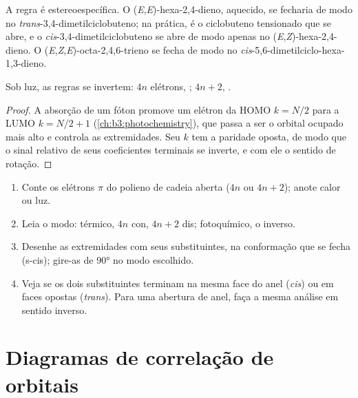 A regra é estereoespecífica. O (\textit{E},\textit{E})-hexa-2,4-dieno, aquecido, se fecharia
de modo  no \textit{trans}-3,4-dimetilciclobuteno; na prática, é o
ciclobuteno tensionado que se abre, e o \textit{cis}-3,4-dimetilciclobuteno se abre
de modo  apenas no (\textit{E},\textit{Z})-hexa-2,4-dieno. O (\textit{E},\textit{Z},\textit{E})-octa-2,4,6-trieno se fecha
de modo  no \textit{cis}-5,6-dimetilciclo-hexa-1,3-dieno.

\begin{proposition}\label{prop:b3:pericyclic:photo-electrocyclic}
Sob luz, as regras se invertem: $4n$ elétrons, ; $4n + 2$, .
\end{proposition}

\begin{proof}
A absorção de um fóton promove um elétron da HOMO $k = N/2$ para a LUMO $k = N/2 + 1$
(\cref{ch:b3:photochemistry}), que passa a ser o orbital ocupado mais alto e
controla as extremidades. Seu $k$ tem a paridade oposta, de modo que o sinal relativo de seus
coeficientes terminais se inverte, e com ele o sentido de rotação.
\end{proof}

\begin{method}\label{met:b3:pericyclic:predict-stereo}
\begin{enumerate}
  \item Conte os elétrons $\pi$ do polieno de cadeia aberta ($4n$ ou $4n + 2$); anote calor ou
        luz.
  \item Leia o modo: térmico, $4n$ con, $4n + 2$ dis; fotoquímico, o inverso.
  \item Desenhe as extremidades com seus substituintes, na conformação que
        se fecha (s-cis); gire-as de 90° no modo escolhido.
  \item Veja se os dois substituintes terminam na mesma face do anel
        (\textit{cis}) ou em faces opostas (\textit{trans}). Para uma abertura de anel, faça a mesma
        análise em sentido inverso.
\end{enumerate}
\end{method}

\section{Diagramas de correlação de orbitais}

